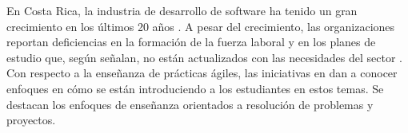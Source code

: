 En Costa Rica, la industria de desarrollo de software ha tenido un gran crecimiento en los últimos 20 años \cite{cenfotec-2, prosic}. A pesar del crecimiento, las organizaciones reportan deficiencias en la formación de la fuerza laboral y en los planes de estudio que, según señalan, no están actualizados con las necesidades del sector \cite{prosic}. Con respecto a la enseñanza de prácticas ágiles, las iniciativas en \cite{trejos-1, salazar, mora-et-al-1, mora-et-al-2} dan a conocer enfoques en cómo se están introduciendo a los estudiantes en estos temas. Se destacan los enfoques de enseñanza orientados a resolución de problemas y proyectos.